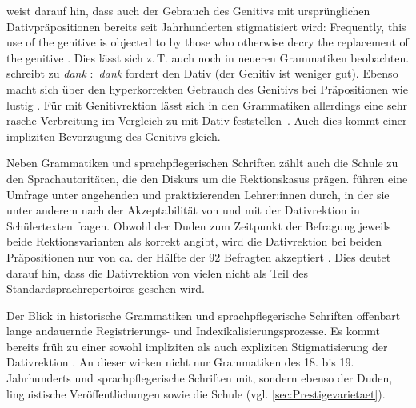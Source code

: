 \begin{sloppypar}
\citeauthor[]{Scott.2014} weist darauf hin, dass auch der Gebrauch des Genitivs mit urspr{\"u}nglichen Dativpr{\"a}positionen bereits seit Jahrhunderten stigmatisiert wird: \glqq Frequently, this use of the genitive is objected to by those who otherwise decry the replacement of the genitive\grqq{} \citep[303]{Scott.2014}.
Dies lässt sich z.\,T. auch noch in neueren Grammatiken beobachten. 
\citet[374]{Jung1980} schreibt zu \textit{dank }:\textit{~}{\glqq}\textit{dank }fordert den Dativ (der Genitiv ist weniger gut){\grqq}.
Ebenso macht \citeauthor{Sick2006} sich über den \glqq hyperkorrekten\grqq{} Gebrauch des Genitivs bei Präpositionen wie  lustig \citep[s.][210]{Davies2006}. 
F{\"u}r \dank{} mit Genitivrektion l{\"a}sst sich in den Grammatiken allerdings eine sehr rasche Verbreitung im Vergleich zu \wegen{} mit Dativ feststellen~\citep[s.][257]{Baumann2014}. 
Auch dies kommt einer impliziten Bevorzugung des Genitivs gleich. 
\end{sloppypar}

Neben Grammatiken und sprachpflegerischen Schriften zählt auch die Schule zu den Sprachautoritäten, die den Diskurs um die Rektionskasus prägen. 
\citet{Baumann2014} führen eine Umfrage unter angehenden und praktizierenden Lehrer:innen durch, in der sie unter anderem nach der Akzeptabilität von \wegen{} und \dank{} mit der Dativrektion in Schülertexten fragen. 
Obwohl der Duden zum Zeitpunkt der Befragung jeweils beide Rektionsvarianten als korrekt angibt, wird die Dativrektion bei beiden Präpositionen nur von ca. der Hälfte der 92 Befragten akzeptiert \citep[s.][264--265]{Baumann2014}. 
Dies deutet darauf hin, dass die Dativrektion von vielen nicht als Teil des Standardsprachrepertoires gesehen wird. 

Der Blick in historische Grammatiken und sprachpflegerische Schriften offenbart lange andauernde Registrierungs- und Indexikalisierungsprozesse. 
Es kommt bereits früh zu einer sowohl impliziten als auch expliziten Stigmatisierung der Dativrektion \citep[s.][]{Davies2006}. 
An dieser wirken nicht nur Grammatiken des 18. bis 19. Jahrhunderts und sprachpflegerische Schriften mit, sondern ebenso der Duden, linguistische Veröffentlichungen sowie die Schule (vgl. \autoref{sec:Prestigevarietaet}). 
